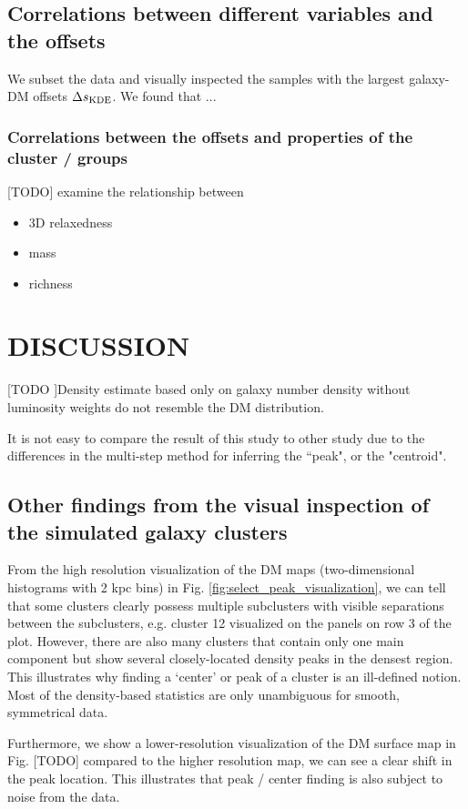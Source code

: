 \subsection{Correlations between different variables and the offsets}
We subset the data and visually inspected the samples with the largest 
galaxy-DM offsets $\Delta s_{\rm KDE}$. We found that ...  

\subsubsection{Correlations between the offsets and properties of the 
cluster / groups}
[TODO] examine the relationship between
\begin{itemize}
\item 3D relaxedness
\item mass 
\item richness  
\end{itemize}



\section{DISCUSSION}\label{sec:discussion}
[TODO ]Density estimate based only on galaxy number density without luminosity 
weights do not resemble the DM distribution.


It is not easy to compare the result of this study to other study due to the 
differences in the multi-step method for inferring the ``peak", or the
"centroid".

\subsection{Other findings from the visual inspection of the simulated galaxy clusters}
From the high resolution visualization of the DM maps (two-dimensional
histograms with 2 kpc bins) in 
Fig. \ref{fig:select_peak_visualization}, we can tell that some clusters clearly
possess multiple subclusters with visible separations between the subclusters, 
e.g. cluster 12 visualized on the panels on row 3 of the plot. 
However, there are also many clusters that contain  
only one main component but show several closely-located density peaks in the
densest region. This illustrates why finding a `center' or peak of a cluster 
is an ill-defined notion. Most of the density-based statistics 
are only unambiguous for smooth, symmetrical data.  

Furthermore, we show a lower-resolution visualization of the DM surface
map in Fig. [TODO] compared to the higher resolution map, we can see a clear
shift in the peak location. This illustrates that peak / center finding is also
subject to noise from the data.

